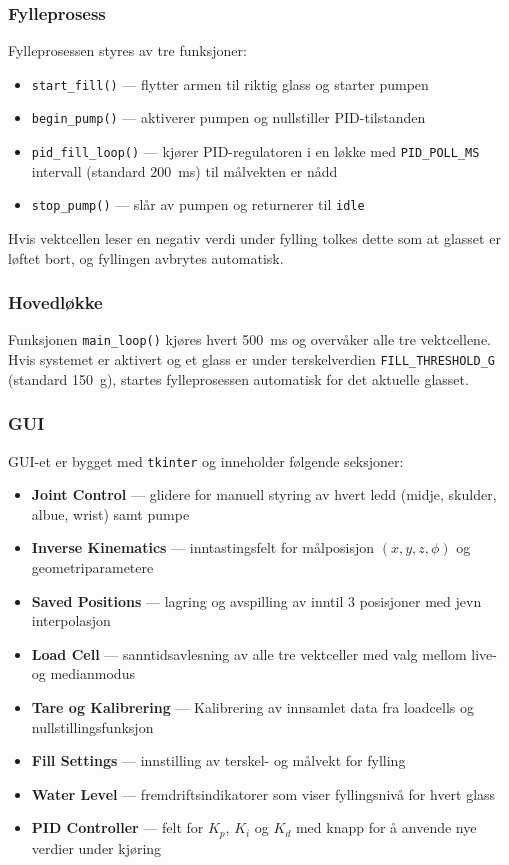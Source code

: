 \subsubsection{Fylleprosess}
Fylleprosessen styres av tre funksjoner:
\begin{itemize}
    \item \texttt{start\_fill()} — flytter armen til riktig glass og starter pumpen
    \item \texttt{begin\_pump()} — aktiverer pumpen og nullstiller PID-tilstanden
    \item \texttt{pid\_fill\_loop()} — kjører PID-regulatoren i en løkke med 
          \texttt{PID\_POLL\_MS} intervall (standard 200~ms) til målvekten er nådd
    \item \texttt{stop\_pump()} — slår av pumpen og returnerer til \texttt{idle}
\end{itemize}

Hvis vektcellen leser en negativ verdi under fylling tolkes dette som at 
glasset er løftet bort, og fyllingen avbrytes automatisk.

\subsubsection{Hovedløkke}
Funksjonen \texttt{main\_loop()} kjøres hvert 500~ms og overvåker alle 
tre vektcellene. Hvis systemet er aktivert og et glass er under 
terskelverdien \texttt{FILL\_THRESHOLD\_G} (standard 150~g), 
startes fylleprosessen automatisk for det aktuelle glasset.

\subsubsection{GUI}
GUI-et er bygget med \texttt{tkinter} og inneholder følgende seksjoner:
\begin{itemize}
    \item \textbf{Joint Control} — glidere for manuell styring av hvert ledd 
          (midje, skulder, albue, wrist) samt pumpe
    \item \textbf{Inverse Kinematics} — inntastingsfelt for målposisjon 
          $(x, y, z, \phi)$ og geometriparametere
    \item \textbf{Saved Positions} — lagring og avspilling av inntil 3 posisjoner med jevn interpolasjon
    \item \textbf{Load Cell} — sanntidsavlesning av alle tre vektceller med valg mellom live- og medianmodus
    \item \textbf{Tare og Kalibrering} — Kalibrering av innsamlet data fra loadcells og nullstillingsfunksjon
    \item \textbf{Fill Settings} — innstilling av terskel- og målvekt for fylling
    \item \textbf{Water Level} — fremdriftsindikatorer som viser fyllingsnivå 
          for hvert glass
    \item \textbf{PID Controller} — felt for $K_p$, $K_i$ og $K_d$ 
          med knapp for å anvende nye verdier under kjøring
\end{itemize}

